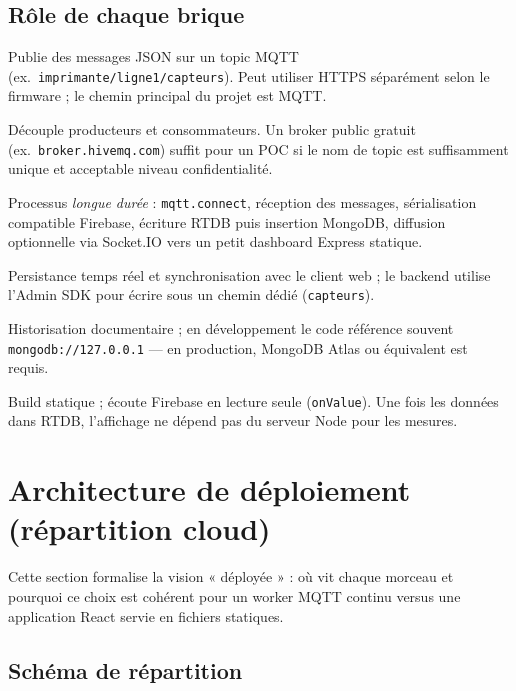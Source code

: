 \documentclass[11pt,a4paper]{article}
\begin{document}
\subsection{Rôle de chaque brique}

\begin{description}[style=nextline]
  \item[ESP32] Publie des messages JSON sur un topic MQTT (ex.\ \texttt{imprimante/ligne1/capteurs}). Peut utiliser HTTPS séparément selon le firmware ; le chemin principal du projet est MQTT.
  \item[Broker MQTT] Découple producteurs et consommateurs. Un broker public gratuit (ex.\ \texttt{broker.hivemq.com}) suffit pour un POC si le nom de topic est suffisamment unique et acceptable niveau confidentialité.
  \item[Backend Node.js] Processus \emph{longue durée} : \texttt{mqtt.connect}, réception des messages, sérialisation compatible Firebase, écriture RTDB puis insertion MongoDB, diffusion optionnelle via Socket.IO vers un petit dashboard Express statique.
  \item[Firebase Realtime Database] Persistance temps réel et synchronisation avec le client web ; le backend utilise l'Admin SDK pour écrire sous un chemin dédié (\texttt{capteurs}).
  \item[MongoDB] Historisation documentaire ; en développement le code référence souvent \texttt{mongodb://127.0.0.1} — en production, MongoDB Atlas ou équivalent est requis.
  \item[Frontend React] Build statique ; écoute Firebase en lecture seule (\texttt{onValue}). Une fois les données dans RTDB, l'affichage ne dépend pas du serveur Node pour les mesures.
\end{description}

\section{Architecture de déploiement (répartition cloud)}

Cette section formalise la vision « déployée » : où vit chaque morceau et pourquoi ce choix est cohérent pour un worker MQTT continu versus une application React servie en fichiers statiques.

\subsection{Schéma de répartition}
\end{document}
